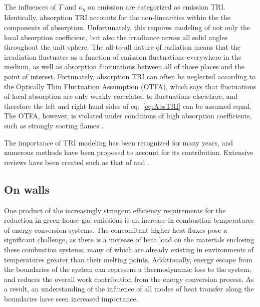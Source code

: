 The influences of $T$ and $\kappa{}_\eta{}$ on emission are categorized as emission TRI. Identically, absorption TRI accounts for the non-linearities within the the components of absorption. Unfortunately, this requires modeling of not only the local absorption coefficient, but also the irradiance across all solid angles throughout the unit sphere.
The all-to-all nature of radiation means that the irradiation fluctuates as a function of emission fluctuations everywhere in the medium, as well as absorption fluctuations between all of those places and the point of interest. Fortunately, absorption TRI can often be neglected according to the Optically Thin Fluctuation Assumption (OTFA), which says that fluctuations of local absorption are only weakly correlated to fluctuations elsewhere, and therefore the left and right hand sides of eq.~\ref{eq:AbsTRI} can be assumed equal.
The OTFA, however, is violated under conditions of high absorption coefficients, such as strongly sooting flames \cite{Modest2016RadiativeSystems}.

The importance of TRI modeling has been recognized for many years, and numerous methods have been proposed to account for its contribution. Extensive reviews have been created such as that of \citet{Modest2016RadiativeSystems} and \citet{Coelho2018RadiativeSystems}. 

\subsection{On walls}
One product of the increasingly stringent efficiency requirements for the reduction in green-house gas emissions is an increase in combustion temperatures of energy conversion systems. 
The concomitant higher heat fluxes pose a significant challenge, as there is a increase of heat load on the materials enclosing these combustion systems, many of which are already existing in environments of temperatures greater than their melting points. 
Additionally, energy escape from the boundaries of the system can represent a thermodynamic loss to the system, and reduces the overall work contribution from the energy conversion process.
As a result, an understanding of the influence of all modes of heat transfer along the boundaries have seen increased importance.

